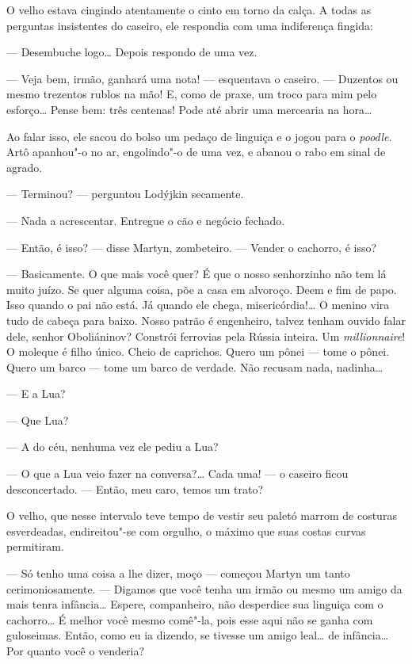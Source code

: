 O velho estava cingindo atentamente o cinto em torno da calça. A todas
as perguntas insistentes do caseiro, ele respondia com uma indiferença
fingida:

--- Desembuche logo\ldots{} Depois respondo de uma vez.

--- Veja bem, irmão, ganhará uma nota! --- esquentava o caseiro. ---
Duzentos ou mesmo trezentos rublos na mão! E, como de praxe, um troco
para mim pelo esforço\ldots{} Pense bem: três centenas! Pode até abrir uma
mercearia na hora\ldots{}

Ao falar isso, ele sacou do bolso um pedaço de linguiça e o jogou para o
\emph{poodle}. Artô apanhou"-o no ar, engolindo"-o de uma vez, e abanou o
rabo em sinal de agrado.

--- Terminou? --- perguntou Lodýjkin secamente.

--- Nada a acrescentar. Entregue o cão e negócio fechado.

--- Então, é isso? --- disse Martyn, zombeteiro. --- Vender o cachorro,
é isso?

--- Basicamente. O que mais você quer? É que o nosso senhorzinho não tem
lá muito juízo. Se quer alguma coisa, põe a casa em alvoroço. Deem e fim
de papo. Isso quando o pai não está. Já quando ele chega,
misericórdia!\ldots{} O menino vira tudo de cabeça para baixo. Nosso patrão é
engenheiro, talvez tenham ouvido falar dele, senhor Oboliáninov?
Constrói ferrovias pela Rússia inteira. Um \emph{millionnaire}! O moleque
é filho único. Cheio de caprichos. Quero um pônei --- tome o pônei.
Quero um barco --- tome um barco de verdade. Não recusam nada,
nadinha\ldots{}

--- E a Lua?

--- Que Lua?

--- A do céu, nenhuma vez ele pediu a Lua?

--- O que a Lua veio fazer na conversa?\ldots{} Cada uma! --- o caseiro ficou
desconcertado. --- Então, meu caro, temos um trato?

O velho, que nesse intervalo teve tempo de vestir seu paletó marrom de
costuras esverdeadas, endireitou"-se com orgulho, o máximo que suas
costas curvas permitiram.

--- Só tenho uma coisa a lhe dizer, moço --- começou Martyn um tanto
cerimoniosamente. --- Digamos que você tenha um irmão ou mesmo um amigo
da mais tenra infância\ldots{} Espere, companheiro, não desperdice sua
linguiça com o cachorro\ldots{} É melhor você mesmo comê"-la, pois esse aqui
não se ganha com guloseimas. Então, como eu ia dizendo, se tivesse um
amigo leal\ldots{} de infância\ldots{} Por quanto você o venderia?

